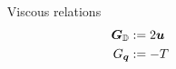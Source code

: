 \documentclass[18pt,xcolor=table]{beamer}
\begin{document}
\begin{frame}[t]
\begin{columns}[t]
\begin{column}{0.3\textwidth}
\end{column} 
\begin{column}{0.3\textwidth}
Viscous relations
\vspace{-2ex}
\begin{align*}
\boldsymbol G_{\mathbb{D}}&:=2\boldsymbol u\\
G_{\boldsymbol q}&:=-T\\
\end{align*}
\end{column} 
\end{columns}
\end{frame}
\end{document}

